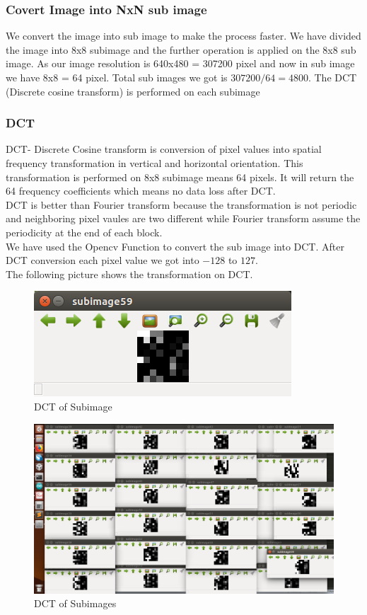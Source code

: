 \documentclass[a4paper]{article}
\begin{document}
\subsubsection{Covert Image into NxN sub image}
We convert the image into sub image to make the process faster. We have divided the image into 8x8 subimage and the further operation is applied on the 8x8 sub image. As our image resolution is 640x480 = 307200 pixel and now in sub image we have 8x8 = 64 pixel. Total sub images we got is $307200/64 = 4800 $. The DCT (Discrete cosine transform) is performed on each subimage
\subsubsection{DCT}
DCT- Discrete Cosine transform is conversion of pixel values into spatial frequency transformation in vertical and horizontal orientation. This transformation is performed on 8x8 subimage means 64 pixels. It will return the 64 frequency coefficients which means no data loss after DCT.\\
DCT is better than Fourier transform because the transformation is not periodic and neighboring pixel vaules are two different while Fourier transform assume the periodicity at the end of each block.\\
We have used the Opencv Function to convert the sub image into DCT. After DCT conversion each pixel value we got into $-128$ to $127$.\\
The following picture shows the transformation on DCT.
\begin{figure}[H]
    \centering
    \includegraphics[width = \linewidth]{single_dct.png}
    \caption{DCT of Subimage}
    \label{fig:my_label}
\end{figure}

\begin{figure}[H]
    \centering
    \includegraphics[width = \linewidth]{full_dct.png}
    \caption{DCT of Subimages}
    \label{fig:my_label}
\end{figure}
\end{document}
